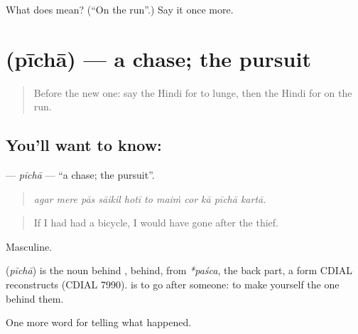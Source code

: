 \begin{tcolorbox}[breakable,colback=teal!4,colframe=teal!35!black,title={Before you move on}]
What does  mean? (\textquotedblleft{}On the run\textquotedblright{}.) Say it once more.
\end{tcolorbox}
\section[\texorpdfstring{\hi{पीछा} (pīchā)}{पीछा (pīchā)}]{ (pīchā) — a chase; the pursuit}

\label{lesson:HI-C289-picha}



\begin{quote}
Before the new one: say the Hindi for to lunge, then the Hindi for on the run.
\end{quote}

\subsection*{You'll want to know: }
\textbf{} — \emph{pīchā} — \textquotedblleft{}a chase; the pursuit\textquotedblright{}.

\begin{quote}
          
\end{quote}

\begin{quote}
\emph{agar mere pās sāikil hotī to maiṁ cor kā pīchā kartā.}
\end{quote}

\begin{quote}
If I had had a bicycle, I would have gone after the thief.
\end{quote}

Masculine.

\begin{cousinweb}
\textbf{} (\emph{pīchā}) is the noun behind \textbf{}, behind, from \emph{*paśca}, the back part, a form CDIAL reconstructs (CDIAL 7990). \textbf{   } is to go after someone: to make yourself the one behind them.
\end{cousinweb}

\begin{grammarlens}[title={What you've built}]
One more word for telling what happened.
\end{grammarlens}

